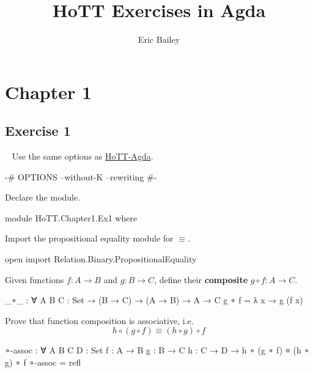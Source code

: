 \documentclass[12pt]{amsart}
\title{HoTT Exercises in Agda}
\author{Eric Bailey}
\begin{document}
\maketitle
\tableofcontents

\newpage
\section{Chapter 1}

\subsection{Exercise 1}\
\newline
Use the same options as \href{https://github.com/HoTT/HoTT-Agda}{HoTT-Agda}.

\begin{code}
{-# OPTIONS --without-K --rewriting #-}
\end{code}

Declare the module.

\begin{code}
module HoTT.Chapter1.Ex1 where
\end{code}

Import the propositional equality module for $\equiv$.

\begin{code}
open import Relation.Binary.PropositionalEquality
\end{code}

Given functions $f : A \to B$ and $g : B \to C$, define their {\bf composite} $g \circ f : A \to C$.

\begin{code}
_∘_ : ∀ {A B C : Set} → (B → C) → (A → B) → A → C
g ∘ f = λ x → g (f x)
\end{code}

Prove that function composition is associative, i.e.
\[
  h \circ (g \circ f) \equiv (h \circ g) \circ f
\]

\begin{code}
∘-assoc : ∀ {A B C D : Set} {f : A → B} {g : B → C} {h : C → D} →
          h ∘ (g ∘ f) ≡ (h ∘ g) ∘ f
∘-assoc = refl
\end{code}
\end{document}
